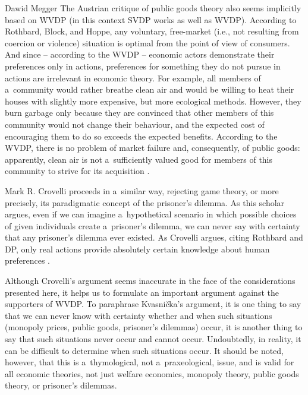\begin{artengenv}{Dawid Megger}
The Austrian critique of public goods theory also seems implicitly based on WVDP (in this context SVDP works as well as WVDP). According to Rothbard, Block, and Hoppe, any voluntary, free-market (i.e., not resulting from coercion or violence) situation is optimal from the point of view of consumers. And since -- according to the WVDP -- economic actors demonstrate their preferences only in actions, preferences for something they do not pursue in actions are irrelevant in economic theory. For example, all members of a~community would rather breathe clean air and would be willing to heat their houses with slightly more expensive, but more ecological methods. However, they burn garbage only because they are convinced that other members of this community would not change their behaviour, and the expected cost of encouraging them to do so exceeds the expected benefits. According to the WVDP, there is no problem of market failure and, consequently, of public goods: apparently, clean air is not a~sufficiently valued good for members of this community to strive for its acquisition 
\parencites[][]{block_public_1983}[][]{hoppe_theory_1989}[][]{hoppe_economics_2006}[][]{wisniewski_economics_2018}.%




Mark R. Crovelli proceeds in a~similar way, rejecting game theory, or more precisely, its paradigmatic concept of the prisoner's dilemma. As this scholar argues, even if we can imagine a~hypothetical scenario in which possible choices of given individuals create a~prisoner's dilemma, we can never say with certainty that any prisoner's dilemma ever existed. As Crovelli argues, citing Rothbard and DP, only real actions provide absolutely certain knowledge about human preferences 
\parencite[][]{crovelli_trouble_2006}.%




Although Crovelli's argument seems inaccurate in the face of the considerations presented here, it helps us to formulate an important argument against the supporters of WVDP. To paraphrase Kvasnička's argument, it is one thing to say that we can never know with certainty whether and when such situations (monopoly prices, public goods, prisoner's dilemmas) occur, it is another thing to say that such situations never occur and cannot occur. Undoubtedly, in reality, it can be difficult to determine when such situations occur. It should be noted, however, that this is a~thymological, not a~praxeological, issue, and is valid for all economic theories, not just welfare economics, monopoly theory, public goods theory, or prisoner's dilemmas.




\end{artengenv}
